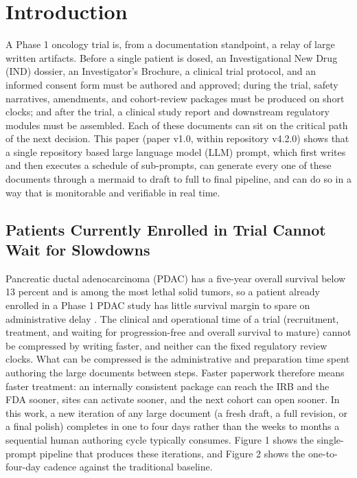 \section{Introduction}

A Phase 1 oncology trial is, from a documentation standpoint, a relay of large
written artifacts. Before a single patient is dosed, an Investigational New Drug
(IND) dossier, an Investigator's Brochure, a clinical trial protocol, and an
informed consent form must be authored and approved; during the trial, safety
narratives, amendments, and cohort-review packages must be produced on short
clocks; and after the trial, a clinical study report and downstream regulatory
modules must be assembled. Each of these documents can sit on the critical path of
the next decision. This paper (paper v1.0, within repository v4.2.0) shows that a
single repository based large language model (LLM) prompt, which first writes and
then executes a schedule of sub-prompts, can generate every one of these documents
through a mermaid to draft to full to final pipeline, and can do so in a way that
is monitorable and verifiable in real time.

\subsection{Patients Currently Enrolled in Trial Cannot Wait for Slowdowns}

Pancreatic ductal adenocarcinoma (PDAC) has a five-year overall survival below 13
percent and is among the most lethal solid tumors, so a patient already enrolled in
a Phase 1 PDAC study has little survival margin to spare on administrative delay
\cite{kawchak_2025_15735068, natplatform}. The clinical and operational time of a
trial (recruitment, treatment, and waiting for progression-free and overall
survival to mature) cannot be compressed by writing faster, and neither can the
fixed regulatory review clocks. What can be compressed is the administrative and
preparation time spent authoring the large documents between steps. Faster
paperwork therefore means faster treatment: an internally consistent package can
reach the IRB and the FDA sooner, sites can activate sooner, and the next cohort can
open sooner. In this work, a new iteration of any large document (a fresh draft, a
full revision, or a final polish) completes in one to four days rather than the
weeks to months a sequential human authoring cycle typically consumes. Figure 1
shows the single-prompt pipeline that produces these iterations, and Figure 2 shows
the one-to-four-day cadence against the traditional baseline.

